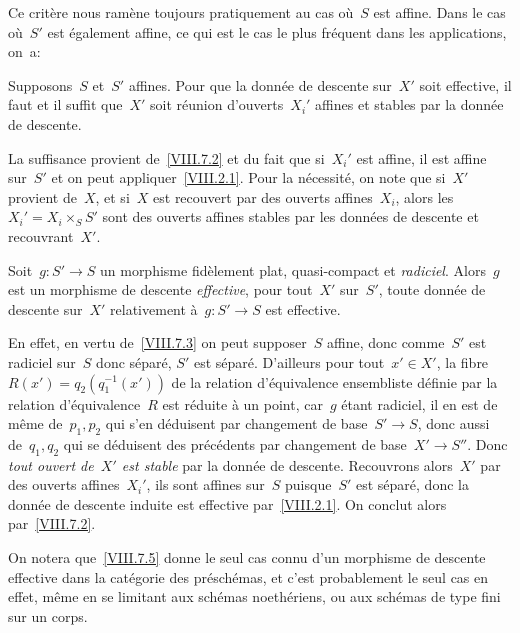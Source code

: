 Ce crit\`ere nous ram\`ene toujours pratiquement au cas o\`u~$S$
est affine. Dans le cas o\`u~$S'$ est \'egalement affine, ce qui
est le cas le plus fr\'equent dans les applications, on~a:

\begin{corollaire}
\label{VIII.7.4}
Supposons~$S$ et~$S'$ affines. Pour que la donn\'ee de descente
sur~$X'$ soit effective, il faut et il suffit que~$X'$ soit
r\'eunion d'ouverts~$X_{i}'$ affines et stables par la donn\'ee de
descente.
\end{corollaire}

La suffisance provient de~\ref{VIII.7.2} et du fait que si~$X_{i}'$
est affine, il est affine sur~$S'$ et on peut
appliquer~\ref{VIII.2.1}. Pour la n\'ecessit\'e, on note que
si~$X'$ provient de~$X$, et si~$X$ est recouvert par des ouverts
affines~$X_{i}$, alors les~$X_{i}'=X_{i}\times_{S}S'$ sont des ouverts
affines stables par les donn\'ees de descente et recouvrant~$X'$.

\begin{corollaire}
\label{VIII.7.5}
Soit~$g\colon S'\to S$ un morphisme fid\`element plat, quasi-compact
et \emph{radiciel}. Alors~$g$ est un morphisme de descente
\emph{effective}, \ie pour tout~$X'$ sur~$S'$, toute donn\'ee de
descente sur~$X'$ relativement \`a~$g\colon S'\to S$ est effective.
\end{corollaire}

En effet, en vertu de~\ref{VIII.7.3} on peut supposer~$S$ affine, donc
comme~$S'$ est radiciel sur~$S$ donc s\'epar\'e, $S'$ est
s\'epar\'e. D'ailleurs pour tout~$x'\in X'$, la
fibre~$R(x')=q_{2}(q_{1}^{-1}(x'))$ de la relation d'\'equivalence
ensembliste d\'efinie
par la relation d'\'equivalence~$R$ est r\'eduite \`a un point,
car~$g$ \'etant radiciel, il en est de m\^eme de~$p_{1},p_{2}$ qui
s'en d\'eduisent par changement de base~$S'\to S$, donc aussi
de~$q_{1},q_{2}$ qui se d\'eduisent des pr\'ec\'edents par
changement de base~$X'\to S''$. Donc \emph{tout ouvert de~$X'$ est
stable} par la donn\'ee de descente. Recouvrons alors~$X'$ par des
ouverts affines~$X_{i}'$, ils sont affines sur~$S$ puisque~$S'$ est
s\'epar\'e, donc la donn\'ee de descente induite est effective
par~\ref{VIII.2.1}. On conclut alors par~\ref{VIII.7.2}.

On notera que~\ref{VIII.7.5} donne le seul cas connu d'un morphisme de
descente effective dans la cat\'egorie des pr\'esch\'emas, et
c'est probablement le seul cas en effet, m\^eme en se limitant aux
sch\'emas noeth\'eriens, ou aux sch\'emas de type fini sur un
corps.

